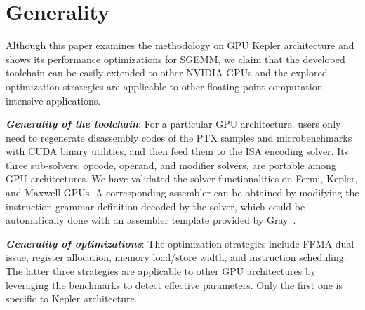 \section{Generality}
\label{sec:generality}

Although this paper examines the methodology on GPU Kepler architecture and shows its performance optimizations for SGEMM, we claim that the developed toolchain can be easily extended to other NVIDIA GPUs and the explored optimization strategies are applicable to other floating-point computation-intensive applications.

{\em {\bf Generality of the toolchain}}: For a particular GPU architecture, users only need to regenerate disassembly codes of the PTX samples and microbenchmarks with CUDA binary utilities, and then feed them to the ISA encoding solver.
Its three sub-solvers, opcode, operand, and modifier solvers, are portable among GPU architectures. 
We have validated the solver functionalities on Fermi, Kepler, and Maxwell GPUs. 
A corresponding assembler can be obtained by modifying the instruction grammar definition decoded by the solver, which could be automatically done with an assembler template provided by Gray~\cite{baldassin2005extending}.

{\em {\bf Generality of optimizations}}: The optimization strategies include
FFMA dual-issue, register allocation, memory load/store width, and instruction
scheduling. The latter three strategies are applicable to other GPU
architectures by leveraging the benchmarks to detect effective parameters. 
Only the first one is specific to Kepler architecture. 


